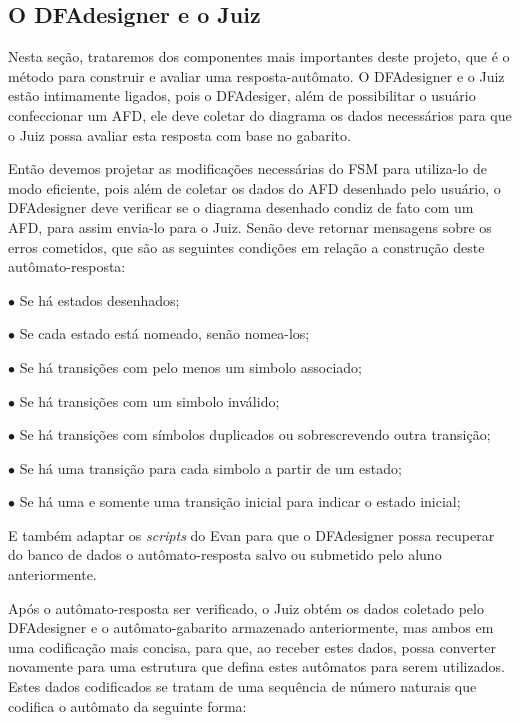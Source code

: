 \documentclass[
	12pt,				%
	openany,
	oneside,
	a4paper,			%
	english,			%
	brazil				%
	]{abntex2}
\begin{document}
  \subsection{O DFAdesigner e o Juiz}

  Nesta seção, trataremos dos componentes mais importantes deste projeto, que é o método para construir e avaliar uma resposta-autômato. O DFAdesigner e o Juiz estão intimamente ligados, pois o DFAdesiger, além de possibilitar o usuário confeccionar um AFD, ele deve coletar do diagrama os dados necessários para que o Juiz possa avaliar esta resposta com base no gabarito.

  Então devemos projetar as modificações necessárias do FSM para utiliza-lo de modo eficiente, pois além de coletar os dados do AFD desenhado pelo usuário, o DFAdesigner deve verificar se o diagrama desenhado condiz de fato com um AFD, para assim envia-lo para o Juiz. Senão deve retornar mensagens sobre os erros cometidos, que são as seguintes condições em relação a construção deste autômato-resposta:
  

\begin{alineas}
  \item[$\bullet$] Se há estados desenhados;
  \item[$\bullet$] Se cada estado está nomeado, senão nomea-los;
  \item[$\bullet$] Se há transições com pelo menos um simbolo associado;
  \item[$\bullet$] Se há transições com um simbolo inválido;
  \item[$\bullet$] Se há transições com símbolos duplicados ou sobrescrevendo outra transição;
  \item[$\bullet$] Se há uma transição para cada simbolo a partir de um estado;
  \item[$\bullet$] Se há uma e somente uma transição inicial para indicar o estado inicial;
\end{alineas}

  E também adaptar os \textit{scripts} do Evan para que o DFAdesigner possa recuperar do banco de dados o autômato-resposta salvo ou submetido pelo aluno anteriormente.

  Após o autômato-resposta ser verificado, o Juiz obtém os dados coletado pelo DFAdesigner e o autômato-gabarito armazenado anteriormente, mas ambos em uma codificação mais concisa, para que, ao receber estes dados, possa converter novamente para uma estrutura que defina estes autômatos para serem utilizados. Estes dados codificados se tratam de uma sequência de número naturais que codifica o autômato da seguinte forma:
 
\end{document}
